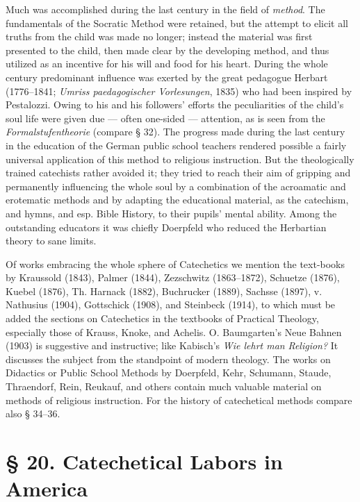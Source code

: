 Much was accomplished during the last century in the field of \emph{method}. The fundamentals of the Socratic Method were retained, but the attempt to elicit all truths from the child was made no longer; instead the material was first presented to the child, then made clear by the developing method, and thus utilized as an incentive for his will and food for his heart. During the whole century predominant influence was exerted by the great pedagogue Herbart (1776–1841; \emph{Umriss paedagogischer Vorlesungen}, 1835) who had been inspired by Pestalozzi. Owing to his and his followers’ efforts the peculiarities of the child’s soul life were given due — often one-sided — attention, as is seen from the \emph{Formalstufentheorie} (compare § 32). The progress made during the last century in the education of the German public school teachers rendered possible a fairly universal application of this method to religious instruction. But the theologically trained catechists rather avoided it; they tried to reach their aim of gripping and permanently influencing the whole soul by a combination of the acroamatic and erotematic methods and by adapting the educational material, as the catechism, and hymns, and esp. Bible History, to their pupils’ mental ability. Among the outstanding educators it was chiefly Doerpfeld who reduced the Herbartian theory to sane limits.

Of works embracing the whole sphere of Catechetics we mention the text-books by Kraussold (1843), Palmer (1844), Zezschwitz (1863–1872), Schuetze (1876), Kuebel (1876), Th. Harnack (1882), Buchrucker (1889), Sachsse (1897), v. Nathusius (1904), Gottschick (1908), and Steinbeck (1914), to which must be added the sections on Catechetics in the textbooks of Practical Theology, especially those of Krauss, Knoke, and Achelis. O. Baumgarten’s Neue Bahnen (1903) is suggestive and instructive; like Kabisch’s \emph{Wie lehrt man}
\emph{Religion?} It discusses the subject from the standpoint of modern theology. The works on Didactics or Public School Methods by Doerpfeld, Kehr, Schumann, Staude, Thraendorf, Rein, Reukauf, and others contain much valuable material on methods of religious instruction. For the history of catechetical methods compare also § 34–36.

\section{§ 20. Catechetical Labors in America}

